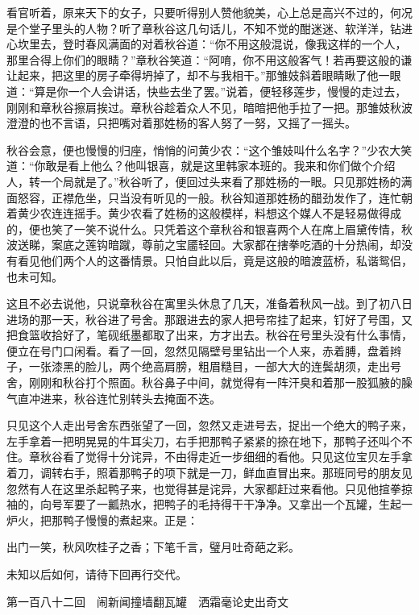 \documentclass[12pt,UTF8]{ctexbook}
\begin{document}
{{{看官听着，原来天下的女子，只要听得别人赞他貌美，心上总是高兴不过的，何况是个堂子里头的人物？听了章秋谷这几句话儿，不知不觉的酣迷迷、软洋洋，钻进心坎里去，登时春风满面的对着秋谷道：“你不用这般混说，像我这样的一个人，那里合得上你们的眼睛？”章秋谷笑道：“阿唷，你不用这般客气！若再要这般的谦让起来，把这里的房子牵得坍掉了，却不与我相干。”那雏妓斜着眼睛瞅了他一眼道：“算是你一个人会讲话，快些去坐了罢。”说着，便轻移莲步，慢慢的走过去，刚刚和章秋谷擦肩挨过。章秋谷趁着众人不见，暗暗把他手拉了一把。那雏妓秋波澄澄的也不言语，只把嘴对着那姓杨的客人努了一努，又摇了一摇头。

秋谷会意，便也慢慢的归座，悄悄的问黄少农：“这个雏妓叫什么名字？”少农大笑道：“你敢是看上他么？他叫银喜，就是这里韩家本班的。我来和你们做个介绍人，转一个局就是了。”秋谷听了，便回过头来看了那姓杨的一眼。只见那姓杨的满面怒容，正襟危坐，只当没有听见的一般。秋谷知道那姓杨的醋劲发作了，连忙朝着黄少农连连摇手。黄少农看了姓杨的这般模样，料想这个媒人不是轻易做得成的，便也笑了一笑不说什么。只凭着这个章秋谷和银喜两个人在席上眉黛传情，秋波送睇，案底之莲钩暗蹴，尊前之宝靥轻回。大家都在搳拳吃酒的十分热闹，却没有看见他们两个人的这番情景。只怕自此以后，竟是这般的暗渡蓝桥，私谐鸳侣，也未可知。

这且不必去说他，只说章秋谷在寓里头休息了几天，准备着秋风一战。到了初八日进场的那一天，秋谷进了号舍。那跟进去的家人把号帘挂了起来，钉好了号围，又把食篮收拾好了，笔砚纸墨都取了出来，方才出去。秋谷在号里头没有什么事情，便立在号门口闲看。看了一回，忽然见隔壁号里钻出一个人来，赤着膊，盘着辫子，一张漆黑的脸儿，两个绝高肩膀，粗眉糙目，一部大大的连鬓胡须，走出号舍，刚刚和秋谷打个照面。秋谷鼻子中间，就觉得有一阵汗臭和着那一股狐腋的臊气直冲进来，秋谷连忙别转头去掩面不迭。

只见这个人走出号舍东西张望了一回，忽然又走进号去，捉出一个绝大的鸭子来，左手拿着一把明晃晃的牛耳尖刀，右手把那鸭子紧紧的捺在地下，那鸭子还叫个不住。章秋谷看了觉得十分诧异，不由得走近一步细细的看他。只见这位宝贝左手拿着刀，调转右手，照着那鸭子的项下就是一刀，鲜血直冒出来。那班同号的朋友见忽然有人在这里杀起鸭子来，也觉得甚是诧异，大家都赶过来看他。只见他揎拳掠袖的，向号军要了一瓤热水，把鸭子的毛持得干干净净。又拿出一个瓦罐，生起一炉火，把那鸭子慢慢的煮起来。正是：

出门一笑，秋风吹桂子之香；下笔千言，璧月吐奇葩之彩。

未知以后如何，请待下回再行交代。





第一百八十二回　闹新闻撞墙翻瓦罐　洒霜毫论史出奇文





}}}
\end{document}
